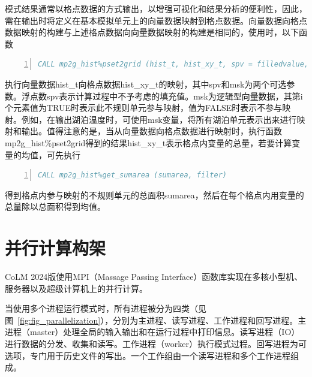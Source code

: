 \documentclass[a4paper,12pt,twoside]{article}
\begin{document}
模式结果通常以格点数据的方式输出，以增强可视化和结果分析的便利性，因此，需在输出时将定义在基本模拟单元上的向量数据映射到格点数据。向量数据向格点数据映射的构建与上述格点数据向向量数据映射的构建是相同的，使用时，以下函数
\begin{lstlisting}[language=fortran, basicstyle=\linespread{1.0}\footnotesize\ttfamily, commentstyle=\color{olive}, numbers=left, numberstyle=\tiny, xleftmargin=1.5em,xrightmargin=0em, aboveskip=1em]
    CALL mp2g_hist%pset2grid (hist_t, hist_xy_t, spv = filledvalue, msk = filter) 
\end{lstlisting}
执行向量数据hist\_t向格点数据hist\_xy\_t的映射，其中spv和msk为两个可选参数。浮点数spv表示计算过程中不予考虑的填充值。msk为逻辑型向量数据，其第i个元素值为TRUE时表示此不规则单元参与映射，值为FALSE时表示不参与映射。例如，在输出湖泊温度时，可使用msk变量，将所有湖泊单元表示出来进行映射和输出。值得注意的是，当从向量数据向格点数据进行映射时，执行函数mp2g\_hist\%pset2grid得到的结果hist\_xy\_t表示格点内变量的总量，若要计算变量的均值，可先执行
\begin{lstlisting}[language=fortran, basicstyle=\linespread{1.0}\footnotesize\ttfamily, commentstyle=\color{olive}, numbers=left, numberstyle=\tiny, xleftmargin=1.5em,xrightmargin=0em, aboveskip=1em]
    CALL mp2g_hist%get_sumarea (sumarea, filter)
\end{lstlisting}
得到格点内参与映射的不规则单元的总面积sumarea，然后在每个格点内用变量的总量除以总面积得到均值。


\section{并行计算构架}\label{ch_parallel}

CoLM 2024版使用MPI（Massage Passing Interface）函数库实现在多核小型机、服务器以及超级计算机上的并行计算。

当使用多个进程运行模式时，所有进程被分为四类（见图~\ref{fig:fig_parallelization}），分别为主进程、读写进程、工作进程和回写进程。主进程（master）处理全局的输入输出和在运行过程中打印信息。读写进程（IO）进行数据的分发、收集和读写。工作进程（worker）执行模式过程。回写进程为可选项，专门用于历史文件的写出。一个工作组由一个读写进程和多个工作进程组成。
\end{document}
